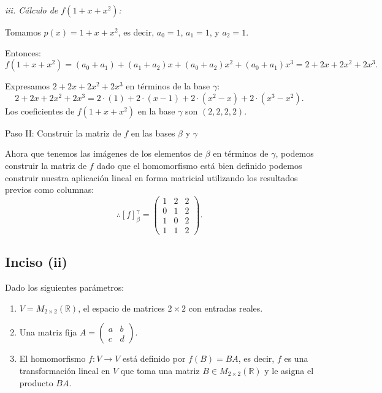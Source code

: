 \documentclass{article}
\begin{document}
\noindent\textit{iii. Cálculo de \( f(1 + x + x^2) \):}

   Tomamos \( p(x) = 1 + x + x^2 \), es decir, \( a_0 = 1 \), \( a_1 = 1 \), y \( a_2 = 1 \).

   Entonces:
   \[
   f(1 + x + x^2) = (a_0 + a_1) + (a_1 + a_2)x + (a_0 + a_2)x^2 + (a_0 + a_1)x^3 = 2 + 2x + 2x^2 + 2x^3.
   \]

   Expresamos \( 2 + 2x + 2x^2 + 2x^3 \) en términos de la base \( \gamma \):
   \[
   2 + 2x + 2x^2 + 2x^3 = 2 \cdot (1) + 2 \cdot (x - 1) + 2 \cdot (x^2 - x) + 2 \cdot (x^3 - x^2).
   \]
   Los coeficientes de \( f(1 + x + x^2) \) en la base \( \gamma \) son \( (2, 2, 2, 2) \).

Paso II: Construir la matriz de \( f \) en las bases \( \beta \) y \( \gamma \)

Ahora que tenemos las imágenes de los elementos de \( \beta \) en términos de \( \gamma \), podemos construir la matriz de \( f \) dado que el homomorfismo está bien definido podemos construir nuestra aplicación lineal en forma matricial utilizando los resultados previos como columnas:
\[
\therefore [f]_\beta^\gamma = \begin{pmatrix} 1 & 2 & 2 \\ 0 & 1 & 2 \\ 1 & 0 & 2 \\ 1 & 1 & 2 \end{pmatrix}.
\]
 \textit{ }
\hline
\subsection*{Inciso (ii)}

Dado los siguientes parámetros:
\begin{enumerate}
\item \( V = M_{2 \times 2}(\mathbb{R}) \), el espacio de matrices \( 2 \times 2 \) con entradas reales.
\item Una matriz fija \( A = \begin{pmatrix} a & b \\ c & d \end{pmatrix} \).
\item El homomorfismo \( f : V \rightarrow V \) está definido por \( f(B) = BA \), es decir, \( f \) es una transformación lineal en \( V \) que toma una matriz \( B \in M_{2 \times 2}(\mathbb{R}) \) y le asigna el producto \( BA \).
\end{enumerate}
\end{document}
